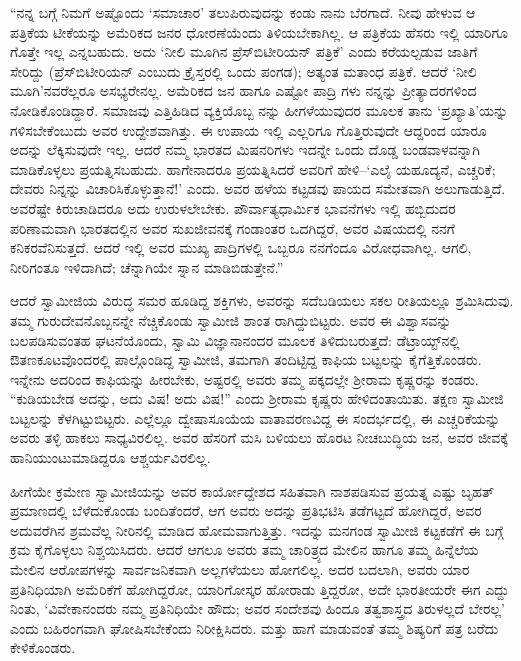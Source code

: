 “ನನ್ನ ಬಗ್ಗೆ ನಿಮಗೆ ಅಷ್ಟೊಂದು ‘ಸಮಾಚಾರ’ ತಲುಪಿರುವುದನ್ನು ಕಂಡು ನಾನು ಬೆರಗಾದೆ. ನೀವು ಹೇಳುವ ಆ  ಪತ್ರಿಕೆಯ ಟೀಕೆಯನ್ನು ಅಮೆರಿಕದ ಜನರ ಧೋರಣೆಯೆಂದು ತಿಳಿಯಬೇಕಾಗಿಲ್ಲ. ಆ ಪತ್ರಿಕೆಯ ಹೆಸರು ಇಲ್ಲಿ ಯಾರಿಗೂ ಗೊತ್ತೇ ಇಲ್ಲ ಎನ್ನಬಹುದು. ಅದು ‘ನೀಲಿ ಮೂಗಿನ ಪ್ರೆಸ್​ಬಿಟೀರಿಯನ್ ಪತ್ರಿಕೆ’ ಎಂದು ಕರೆಯಲ್ಪಡುವ ಜಾತಿಗೆ ಸೇರಿದ್ದು (ಪ್ರೆಸ್​ಬಿಟೀರಿಯನ್ ಎಂಬುದು ಕ್ರೈಸ್ತರಲ್ಲಿ ಒಂದು ಪಂಗಡ); ಅತ್ಯಂತ ಮತಾಂಧ ಪತ್ರಿಕೆ. ಆದರೆ ‘ನೀಲಿ ಮೂಗಿ’ನವರೆಲ್ಲರೂ ಅಸಭ್ಯರೇನಲ್ಲ. ಅಮೆರಿಕದ ಜನ ಹಾಗೂ ಎಷ್ಟೋ ಪಾದ್ರಿ ಗಳು ನನ್ನನ್ನು ಪ್ರೀತ್ಯಾದರಗಳಿಂದ ನೋಡಿಕೊಂಡಿದ್ದಾರೆ. ಸಮಾಜವು ಎತ್ತಿಹಿಡಿದ ವ್ಯಕ್ತಿಯೊಬ್ಬ ನನ್ನು ಹೀಗಳೆಯುವುದರ ಮೂಲಕ ತಾನು ‘ಪ್ರಖ್ಯಾತಿ’ಯನ್ನು ಗಳಿಸಬೇಕೆಂಬುದು ಅವರ ಉದ್ದೇಶವಾಗಿತ್ತು. ಈ ಉಪಾಯ ಇಲ್ಲಿ ಎಲ್ಲರಿಗೂ ಗೊತ್ತಿರುವುದೇ ಆದ್ದರಿಂದ ಯಾರೂ ಅದನ್ನು ಲೆಕ್ಕಿಸುವುದೇ ಇಲ್ಲ. ಆದರೆ ನಮ್ಮ ಭಾರತದ ಮಿಷನರಿಗಳು ಇದನ್ನೇ ಒಂದು ದೊಡ್ಡ ಬಂಡವಾಳವನ್ನಾಗಿ ಮಾಡಿಕೊಳ್ಳಲು ಪ್ರಯತ್ನಿಸಬಹುದು. ಹಾಗೇನಾದರೂ ಪ್ರಯತ್ನಿಸಿದರೆ ಅವರಿಗೆ ಹೇಳಿ–‘ಎಲೈ ಯಹೂದ್ಯನೆ, ಎಚ್ಚರಿಕೆ; ದೇವರು ನಿನ್ನನ್ನು ವಿಚಾರಿಸಿಕೊಳ್ಳುತ್ತಾನೆ!’ ಎಂದು. ಅವರ ಹಳೆಯ ಕಟ್ಟಡವು ಪಾಯದ ಸಮೇತವಾಗಿ ಅಲುಗಾಡುತ್ತಿದೆ. ಅವರೆಷ್ಟೇ ಕಿರುಚಾಡಿದರೂ ಅದು ಉರುಳಲೇಬೇಕು. ಪೌರ್ವಾತ್ಯಧಾರ್ಮಿಕ ಭಾವನೆಗಳು ಇಲ್ಲಿ ಹಬ್ಬಿದುದರ ಪರಿಣಾಮವಾಗಿ ಭಾರತದಲ್ಲಿನ ಅವರ ಸುಖಜೀವನಕ್ಕೆ ಗಂಡಾಂತರ ಒದಗಿದ್ದರೆ, ಅವರ ವಿಷಯದಲ್ಲಿ ನನಗೆ ಕನಿಕರವೆನಿಸುತ್ತದೆ. ಆದರೆ ಇಲ್ಲಿ ಅವರ ಮುಖ್ಯ ಪಾದ್ರಿಗಳಲ್ಲಿ ಒಬ್ಬರೂ ನನಗೆಂದೂ ವಿರೋಧವಾಗಿಲ್ಲ. ಆಗಲಿ, ನೀರಿಗಂತೂ ಇಳಿದಾಗಿದೆ; ಚೆನ್ನಾಗಿಯೇ ಸ್ನಾನ ಮಾಡಿಬಿಡುತ್ತೇನೆ.”

ಆದರೆ ಸ್ವಾಮೀಜಿಯ ವಿರುದ್ಧ ಸಮರ ಹೂಡಿದ್ದ ಶಕ್ತಿಗಳು, ಅವರನ್ನು ಸದೆಬಡಿಯಲು ಸಕಲ ರೀತಿಯಲ್ಲೂ ಶ್ರಮಿಸಿದುವು. ತಮ್ಮ ಗುರುದೇವನೊಬ್ಬನನ್ನೇ ನೆಚ್ಚಿಕೊಂಡು ಸ್ವಾಮೀಜಿ ಶಾಂತ ರಾಗಿದ್ದುಬಿಟ್ಟರು. ಅವರ ಈ ವಿಶ್ವಾಸವನ್ನು ಬಲಪಡಿಸುವಂತಹ ಘಟನೆಯೊಂದು, ಸ್ವಾಮಿ ವಿಜ್ಞಾನಾನಂದರ ಮೂಲಕ ತಿಳಿದುಬರುತ್ತದೆ: ಡೆಟ್ರಾಯ್ಟ್​ನಲ್ಲಿ ಔತಣಕೂಟವೊಂದರಲ್ಲಿ ಪಾಲ್ಗೊಂಡಿದ್ದ ಸ್ವಾಮೀಜಿ, ತಮಗಾಗಿ ತಂದಿಟ್ಟಿದ್ದ ಕಾಫಿಯ ಬಟ್ಟಲನ್ನು ಕೈಗೆತ್ತಿಕೊಂಡರು. ಇನ್ನೇನು ಅದರಿಂದ ಕಾಫಿಯನ್ನು ಹೀರಬೇಕು, ಅಷ್ಟರಲ್ಲಿ ಅವರು ತಮ್ಮ ಪಕ್ಕದಲ್ಲೇ ಶ್ರೀರಾಮ ಕೃಷ್ಣರನ್ನು ಕಂಡರು. “ಕುಡಿಯಬೇಡ ಅದನ್ನು, ಅದು ವಿಷ! ಅದು ವಿಷ!” ಎಂದು ಶ್ರೀರಾಮ ಕೃಷ್ಣರು ಹೇಳಿದಂತಾಯಿತು. ತಕ್ಷಣ ಸ್ವಾಮೀಜಿ ಬಟ್ಟಲನ್ನು ಕೆಳಗಿಟ್ಟುಬಿಟ್ಟರು. ಎಲ್ಲೆಲ್ಲೂ ದ್ವೇಷಾಸೂಯೆಯ ವಾತಾವರಣವಿದ್ದ ಈ ಸಂದರ್ಭದಲ್ಲಿ, ಈ ಎಚ್ಚರಿಕೆಯನ್ನು ಅವರು ತಳ್ಳಿ ಹಾಕಲು ಸಾಧ್ಯವಿರಲಿಲ್ಲ. ಅವರ ಹೆಸರಿಗೆ ಮಸಿ ಬಳಿಯಲು ಹೊರಟ ನೀಚಬುದ್ಧಿಯ ಜನ, ಅವರ ಜೀವಕ್ಕೆ ಹಾನಿಯುಂಟುಮಾಡಿದ್ದರೂ ಆಶ್ಚರ್ಯವಿರಲಿಲ್ಲ.

ಹೀಗೆಯೇ ಕ್ರಮೇಣ ಸ್ವಾಮೀಜಿಯನ್ನು ಅವರ ಕಾರ್ಯೋದ್ದೇಶದ ಸಹಿತವಾಗಿ ನಾಶಪಡಿಸುವ ಪ್ರಯತ್ನ ಎಷ್ಟು ಬೃಹತ್ ಪ್ರಮಾಣದಲ್ಲಿ ಬೆಳೆದುಕೊಂಡು ಬಂದಿತೆಂದರೆ, ಆಗ ಅವರು ಅದನ್ನು ಪ್ರತಿಭಟಿಸಿ ತಡೆಗಟ್ಟದೆ ಹೋಗಿದ್ದರೆ, ಅವರ ಅದುವರೆಗಿನ ಶ್ರಮವೆಲ್ಲ ನೀರಿನಲ್ಲಿ ಮಾಡಿದ ಹೋಮವಾಗುತ್ತಿತ್ತು. ಇದನ್ನು ಮನಗಂಡ ಸ್ವಾಮೀಜಿ ಕಟ್ಟಕಡೆಗೆ ಈ ಬಗ್ಗೆ ಕ್ರಮ ಕೈಗೊಳ್ಳಲು ನಿಶ್ಚಯಿಸಿದರು. ಆದರೆ ಆಗಲೂ ಅವರು ತಮ್ಮ ಚಾರಿತ್ರ್ಯದ ಮೇಲಿನ ಹಾಗೂ ತಮ್ಮ ಹಿನ್ನೆಲೆಯ ಮೇಲಿನ ಆರೋಪಗಳನ್ನು ಸಾರ್ವಜನಿಕವಾಗಿ ಅಲ್ಲಗಳೆಯಲು ಹೋಗಲಿಲ್ಲ. ಅದರ ಬದಲಾಗಿ, ಅವರು ಯಾರ ಪ್ರತಿನಿಧಿಯಾಗಿ ಅಮೆರಿಕೆಗೆ ಹೋಗಿದ್ದರೋ, ಯಾರಿಗೋಸ್ಕರ ಹೋರಾಡು ತ್ತಿದ್ದರೋ, ಅದೇ ಭಾರತೀಯರೇ ಈಗ ಎದ್ದು ನಿಂತು, ‘ವಿವೇಕಾನಂದರು ನಮ್ಮ ಪ್ರತಿನಿಧಿಯೇ ಹೌದು; ಅವರ ಸಂದೇಶವು ಹಿಂದೂ ತತ್ವಶಾಸ್ತ್ರದ ತಿರುಳಲ್ಲದೆ ಬೇರಲ್ಲ’ ಎಂದು ಬಹಿರಂಗವಾಗಿ ಘೋಷಿಸಬೇಕೆಂದು ನಿರೀಕ್ಷಿಸಿದರು. ಮತ್ತು ಹಾಗೆ ಮಾಡುವಂತೆ ತಮ್ಮ ಶಿಷ್ಯರಿಗೆ ಪತ್ರ ಬರೆದು ಕೇಳಿಕೊಂಡರು.

